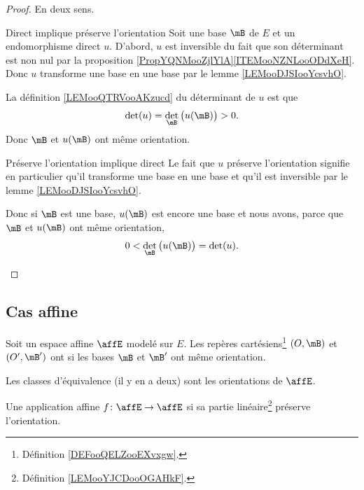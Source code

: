 \begin{proof}
	En deux sens.
	\begin{subproof}
		\item[Direct implique préserve l'orientation]
		Soit une base \( \mB\) de \( E\) et un endomorphisme direct \( u\). D'abord, \( u\) est inversible du fait que son déterminant est non nul par la proposition \ref{PropYQNMooZjlYlA}\ref{ITEMooNZNLooODdXeH}. Donc \( u\) transforme une base en une base par le lemme \ref{LEMooDJSIooYcsvhO}.

		La définition \ref{LEMooQTRVooAKzucd} du déterminant de \( u\) est que
		\begin{equation}
			\det(u)=\det_{\mB}\big( u(\mB) \big)>0.
		\end{equation}
		Donc \( \mB\) et \( u(\mB)\) ont même orientation.
		\item[Préserve l'orientation implique direct]
		Le fait que \( u\) préserve l'orientation signifie en particulier qu'il transforme une base en une base et qu'il est inversible par le lemme \ref{LEMooDJSIooYcsvhO}.

		Donc si \( \mB\) est une base, \( u(\mB)\) est encore une base et nous avons, parce que \( \mB\) et \( u(\mB)\) ont même orientation,
		\begin{equation}
			0<\det_{\mB}\big( u(\mB) \big)=\det(u).
		\end{equation}
	\end{subproof}
\end{proof}

\subsection{Cas affine}

\begin{definition}      \label{DEFooOTFPooIVkHFP}
	Soit un espace affine \( \affE\) modelé sur \( E\). Les repères cartésiens\footnote{Définition \ref{DEFooQELZooEXvxgw}.} \( (O,\mB)\) et \( (O',\mB')\) ont  si les bases \( \mB\) et \( \mB'\) ont même orientation.

	Les classes d'équivalence (il y en a deux) sont les orientations de \( \affE\).

	Une application affine \( f\colon \affE\to \affE\)  si sa partie linéaire\footnote{Définition \ref{LEMooYJCDooOGAHkF}.} préserve l'orientation.
\end{definition}


